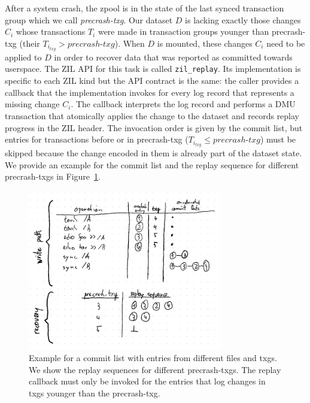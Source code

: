 \documentclass[12pt,a4paper,twoside]{book}
\begin{document}
After a system crash, the zpool is in the state of the last synced transaction group which we call \textit{precrash-txg}.
Our dataset $D$ is lacking exactly those changes $C_i$ whose transactions $T_i$ were made in transaction groups younger than precrash-txg (their $T_{i_{txg}} > precrash\text{-}txg$).
When $D$ is mounted, these changes $C_i$ need to be applied to $D$ in order to recover data that was reported as committed towards userspace.
The ZIL API for this task is called \lstinline{zil_replay}.
Its implementation is specific to each ZIL kind but the API contract is the same:
the caller provides a callback that the implementation invokes for every log record that represents a missing change $C_i$.
The callback interprets the log record and performs a DMU transaction that atomically applies the change to the dataset and records replay progress in the ZIL header.
The invocation order is given by the commit list, but entries for transactions before or in precrash-txg ($T_{i_{txg}} \le precrash\text{-}txg$) must be skipped because the change encoded in them is already part of the dataset state.
We provide an example for the commit list and the replay sequence for different precrash-txgs in Figure~\ref{fig:zil_writepath_and_replay_sequence_logical_level}.

\begin{figure}[H]
    \centering
    \includegraphics[height=7cm]{fig/zil_writepath_and_replay_sequence_logical_level}
    \caption{
        Example for a commit list with entries from different files and txgs.
        We show the replay sequences for different precrash-txgs.
        The replay callback must only be invoked for the entries that log changes in txgs younger than the precrash-txg.
    }
    \label{fig:zil_writepath_and_replay_sequence_logical_level}
\end{figure}
\end{document}
